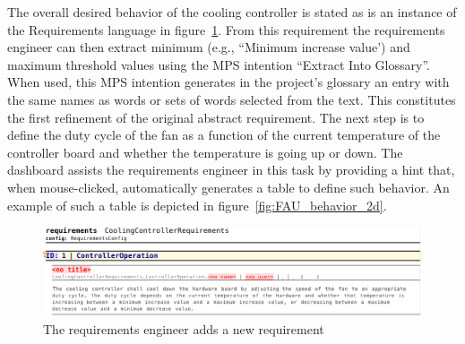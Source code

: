 The overall desired behavior of the cooling controller is stated as is an instance of the
\textsf{Requirements} language in figure~\ref{fig:new_req}. From this
requirement the requirements engineer can then extract minimum (e.g., ``Minimum
increase value') and maximum threshold values
using the MPS intention ``Extract Into Glossary''. When used, this MPS intention generates in the project's glossary an entry with the same names as words or sets of words
selected from the text. This constitutes the first
refinement of the original abstract requirement. The next step is to define the duty cycle of the fan as a function of the current temperature of the controller board and whether the temperature is going up or down. The dashboard assists the requirements engineer in this task by
providing a hint that, when mouse-clicked, automatically generates a table to
define such behavior. An example of such a table is depicted in
figure~\ref{fig:FAU_behavior_2d}.
 \vspace{-.5cm}
\begin{figure}[!h]
\centering 
\includegraphics[width=1\textwidth]{./figures/textReqIncomplete.png}
\vspace{-.7cm}
\caption{The requirements engineer adds a new requirement}
\label{fig:new_req}
\vspace{-.7cm}
\end{figure}

